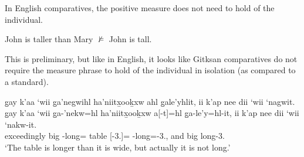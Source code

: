 \documentclass{article}
\begin{document}
In English comparatives, the positive measure does not need to hold of the individual.

\begin{exe}
    \ex John is taller than Mary $\nvDash$ John is tall.
\end{exe}

This is preliminary, but like in English, it looks like Gitksan comparatives do not require the measure phrase to hold of the individual in isolation (as compared to a standard). 


\begin{exe}
    \ex \glll
    g̱ay k’aa ‘wii g̱a’negwihl ha’niitx̱ooḵxw ahl g̱ale’yhlit, ii k’ap nee dii ‘wii ‘nagwit. \\
    g̱ay k’aa ‘wii g̱a-’nekw=hl ha’niitx̱ooḵxw a[-t]=hl g̱a-le’y=hl-it, ii k’ap nee dii ‘wii ‘nakw-it. \\
    \Cntr{} exceedingly big \Distr-long=\Cn{} table \Prep{}[-3.\Ii]=\Cn{} \Distr-long=\Cn{}-3.\Ii, and \Verum{} \Neg{} \Foc{} big long-3.\Ii \\
    \glt `The table is longer than it is wide, but actually it is not long.'
\end{exe}

\printbibliography
\end{document}
